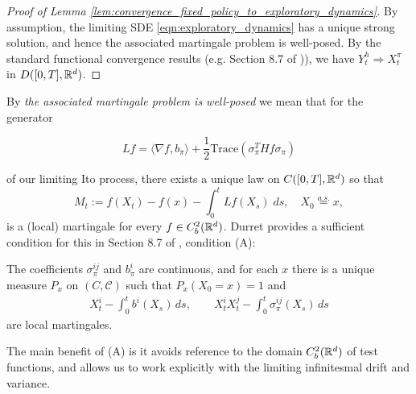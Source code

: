 \begin{proof}[Proof of Lemma \ref{lem:convergence_fixed_policy_to_exploratory_dynamics}]
	By assumption, the limiting SDE \eqref{eqn:exploratory_dynamics} has a unique strong solution, and hence the associated
	martingale problem is well-posed. By the standard functional convergence results (e.g. Section 8.7 of \cite{durrett1996_stochastic_calculus_practical_introduction})), we have $Y^h_t \Rightarrow X^\pi_t$
	in $D([0,T], \mathbb{R}^d)$.
\end{proof}

\noindent By \textit{the associated martingale problem is well-posed} we mean that for the generator

\[Lf = \langle\nabla f,  b_\pi \rangle + \frac{1}{2} \mathrm{Trace}(\sigma_\pi^T Hf \sigma_\pi) \]

\noindent of our limiting Ito process, there exists a unique law on $C([0,T], \mathbb{R}^d)$ so that
%
\[M_t := f(X_t) - f(x) - \int_0^t Lf(X_s) \; ds, \quad X_0 \overset{a.s.}{=} x,\]
%
\noindent is a (local) martingale for every $f \in C^2_b(\mathbb{R}^d)$. Durret provides a sufficient condition for
this in Section 8.7 of \cite{durrett1996_stochastic_calculus_practical_introduction}, condition (A):

\begin{assumption}[A]
	\label{assumption:A}
	The coefficients $\sigma_\pi^{ij}$ and $b_\pi^i$ are continuous, and for each $x$ there is a unique measure $P_x$ on $(C,\mathcal C)$ such that $P_x(X_0=x)=1$ and
	\begin{equation*}
	\begin{aligned}
	X_t^i - \int_0^t b^i(X_s)\,ds,
	\qquad
	X_t^iX_t^j - \int_0^t \sigma_\pi^{ij}(X_s)\,ds
	\end{aligned}
	\end{equation*}
	are local martingales.
\end{assumption}

The main benefit of (A) is it avoids reference
to the domain $C_b^2(\mathbb{R}^d)$ of test functions, and allows us to work explicitly with the limiting infinitesmal drift
and variance.


